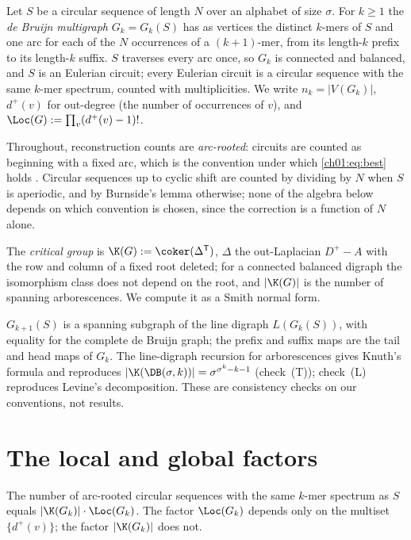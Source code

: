 Let $S$ be a circular sequence of length $N$ over an alphabet of size $\sigma$. For $k\ge1$
the \emph{de Bruijn multigraph} $G_k=G_k(S)$ has as vertices the distinct $k$-mers of $S$
and one arc for each of the $N$ occurrences of a $(k{+}1)$-mer, from its length-$k$ prefix
to its length-$k$ suffix. $S$ traverses every arc once, so $G_k$ is connected and balanced,
and $S$ is an Eulerian circuit; every Eulerian circuit is a circular sequence with the
same $k$-mer spectrum, counted with multiplicities. We write $n_k=|V(G_k)|$, $d^{+}(v)$ for
out-degree (the number of occurrences of $v$), and $\Loc(G):=\prod_v(d^{+}(v)-1)!$.

\begin{remark}\label{ch01:rem:convention}
Throughout, reconstruction counts are \emph{arc-rooted}: circuits are counted as beginning
with a fixed arc, which is the convention under which \eqref{ch01:eq:best} holds
\cite{BEST,SmithTutte}. Circular sequences up to cyclic shift are counted by dividing by
$N$ when $S$ is aperiodic, and by Burnside's lemma otherwise; none of the algebra below
depends on which convention is chosen, since the correction is a function of $N$ alone.
\end{remark}

The \emph{critical group} is $\K(G):=\coker(\Delta^{\mathsf T})$, $\Delta$ the out-Laplacian
$D^{+}-A$ with the row and column of a fixed root deleted; for a connected balanced digraph
the isomorphism class does not depend on the root, and $|\K(G)|$ is the number of spanning
arborescences. We compute it as a Smith normal form.

\begin{remark}\label{ch01:rem:tower}
$G_{k+1}(S)$ is a spanning subgraph of the line digraph $L(G_k(S))$, with equality for the
complete de Bruijn graph; the prefix and suffix maps are the tail and head maps of $G_k$.
The line-digraph recursion for arborescences \cite{Knuth} gives Knuth's formula and reproduces
$|\K(\DB(\sigma,k))|=\sigma^{\sigma^{k}-k-1}$ (check~(T)); check~(L) reproduces Levine's
decomposition. These are consistency checks on our conventions, not results.
\end{remark}

\section{The local and global factors}\label{ch01:sec:decomp}

\begin{proposition}[Decomposition]\label{ch01:prop:decomp}
The number of arc-rooted circular sequences with the same $k$-mer spectrum as $S$ equals
$|\K(G_k)|\cdot\Loc(G_k)$. The factor $\Loc(G_k)$ depends only on the multiset
$\{d^{+}(v)\}$; the factor $|\K(G_k)|$ does not.
\end{proposition}

